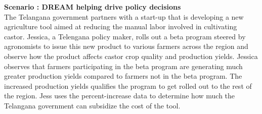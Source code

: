 \begin{flushleft}
\textbf{Scenario : DREAM helping drive policy decisions}\\\smallskip
The Telangana government partners with a start-up that is developing a new agriculture tool aimed at reducing the manual labor involved in cultivating castor. Jessica, a Telengana policy maker, rolls out a beta program steered by agronomists to issue this new product to various farmers across the region and observe how the product affects castor crop quality and production yields. Jessica observes that farmers participating in the beta program are generating much greater production yields compared to farmers not in the beta program. The increased production yields qualifies the program to get rolled out to the rest of the region. Jess uses the percent-increase data to determine how much the Telangana government can subsidize the cost of the tool. 
\end{flushleft}
